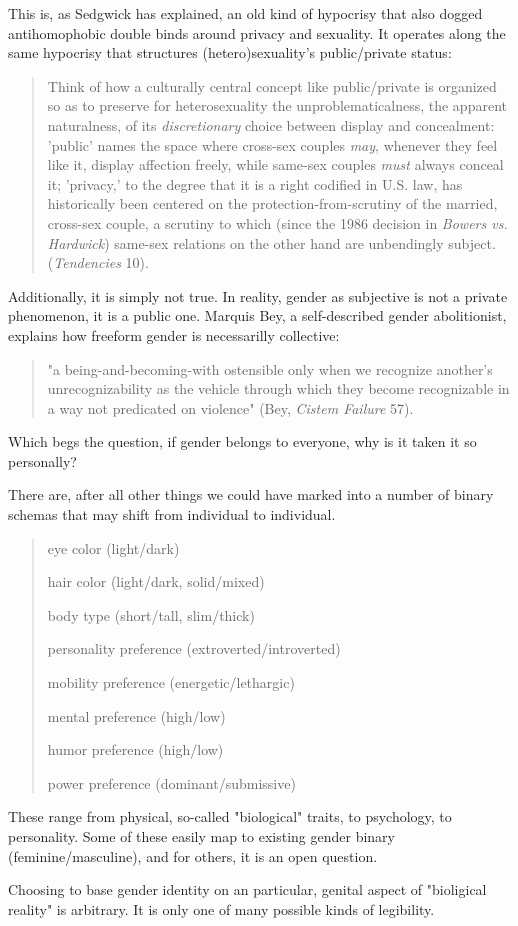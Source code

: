 \documentclass[11pt]{article}
\begin{document}
\begin{enumerate}
This is, as Sedgwick has explained, an old kind of hypocrisy that also
dogged antihomophobic double binds around privacy and sexuality. It
operates along the same hypocrisy that structures (hetero)sexuality's
public/private status:
\begin{quote}
Think of how a culturally central concept like public/private is
organized so as to preserve for heterosexuality the
unproblematicalness, the apparent naturalness, of its \emph{discretionary}
choice between display and concealment: 'public' names the space where
cross-sex couples \emph{may}, whenever they feel like it, display affection
freely, while same-sex couples \emph{must} always conceal it; 'privacy,' to
the degree that it is a right codified in U.S. law, has historically
been centered on the protection-from-scrutiny of the married,
cross-sex couple, a scrutiny to which (since the 1986 decision in
\emph{Bowers vs. Hardwick}) same-sex relations on the other hand are
unbendingly subject. (\emph{Tendencies} 10).  
\end{quote}

Additionally, it is simply not true. In reality, gender as subjective
is not a private phenomenon, it is a public one. Marquis Bey, a
self-described gender abolitionist, explains how freeform gender is
necessarilly collective:
\begin{quote}
"a being-and-becoming-with ostensible only when we recognize another's
unrecognizability as the vehicle through which they become
recognizable in a way not predicated on violence" (Bey, \emph{Cistem
Failure} 57).
\end{quote}
Which begs the question, if gender belongs to everyone, why is it
taken it so personally?

There are, after all other things we could have marked into a number
of binary schemas that may shift from individual to individual.
\begin{quote}
eye color (light/dark)

hair color (light/dark, solid/mixed)

body type (short/tall, slim/thick)

personality preference (extroverted/introverted)

mobility preference (energetic/lethargic)

mental preference (high/low)

humor preference (high/low) 

power preference (dominant/submissive)
\end{quote}
These range from physical, so-called "biological" traits, to
psychology, to personality. Some of these easily map to existing
gender binary (feminine/masculine), and for others, it is an open
question.

Choosing to base gender identity on an particular, genital aspect of
"bioligical reality" is arbitrary. It is only one of many possible
kinds of legibility.
\end{enumerate}
\end{document}
